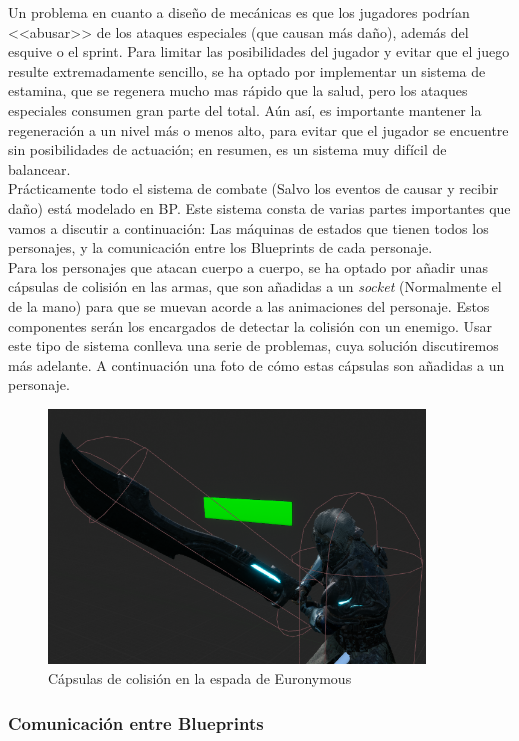 Un problema en cuanto a diseño de mecánicas es que los jugadores podrían <<abusar>> de los ataques especiales (que causan más daño), además del esquive o el sprint. Para limitar las posibilidades del jugador y evitar que el juego resulte extremadamente sencillo, se ha optado por implementar un sistema de estamina, que se regenera mucho mas rápido que la salud, pero los ataques especiales consumen gran parte del total. Aún así, es importante mantener la regeneración a un nivel más o menos alto, para evitar que el jugador se encuentre sin posibilidades de actuación; en resumen, es un sistema muy difícil de balancear. 
\\

Prácticamente todo el sistema de combate (Salvo los eventos de causar y recibir daño) está modelado en \ac{BP}. Este sistema consta de varias partes importantes que vamos a discutir a continuación: Las máquinas de estados que tienen todos los personajes, y la comunicación entre los Blueprints de cada personaje.
\\

Para los personajes que atacan cuerpo a cuerpo, se ha optado por añadir unas cápsulas de colisión en las armas, que son añadidas a un \textit{socket} (Normalmente el de la mano) para que se muevan acorde a las animaciones del personaje. Estos componentes serán los encargados de detectar la colisión con un enemigo. Usar este tipo de sistema conlleva una serie de problemas, cuya solución discutiremos más adelante. A continuación una foto de cómo estas cápsulas son añadidas a un personaje.


\begin{figure}[H]
  \centering
  \includegraphics[width=10cm]{./images/Eur_Weapon.png}
  \caption{Cápsulas de colisión en la espada de Euronymous}
  \label{HenkkaSM}
\end{figure}


\subsubsection{Comunicación entre Blueprints}

